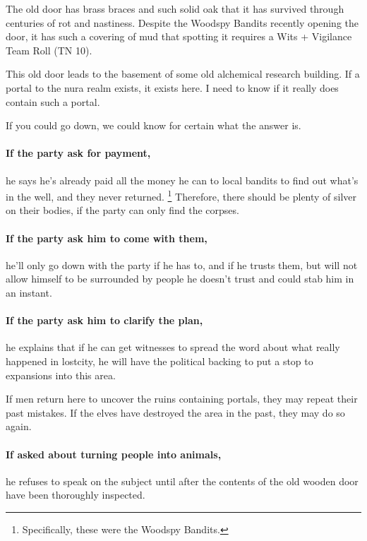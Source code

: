 \begin{multicols}{2}

The old door has brass braces and such solid oak that it has survived through centuries of rot and nastiness.
Despite the Woodspy Bandits recently opening the door, it has such a covering of mud that spotting it requires a Wits + Vigilance Team Roll (TN 10).

\begin{speechtext}
  This old door leads to the basement of some old alchemical research building.
  If a portal to the nura realm exists, it exists here.
  I need to know if it really does contain such a portal.

  If you could go down, we could know for certain what the answer is.
\end{speechtext}

\paragraph{If the party ask for payment,}
he says he's already paid all the money he can to local bandits to find out what's in the well, and they never returned.%
\footnote{Specifically, these were the Woodspy Bandits.}
Therefore, there should be plenty of silver on their bodies, if the party can only find the corpses.

\paragraph{If the party ask him to come with them,}
he'll only go down with the party if he has to, and if he trusts them, but will not allow himself to be surrounded by people he doesn't trust and could stab him in an instant.

\forestpriest

\paragraph{If the party ask him to clarify the plan,}
he explains that if he can get witnesses to spread the word about what really happened in \gls{lostcity}, he will have the political backing to put a stop to expansions into this area.

If men return here to uncover the ruins containing portals, they may repeat their past mistakes.
If the elves have destroyed the area in the past, they may do so again.

\paragraph{If asked about turning people into animals,}
he refuses to speak on the subject until after the contents of the old wooden door have been thoroughly inspected.


\end{multicols}
